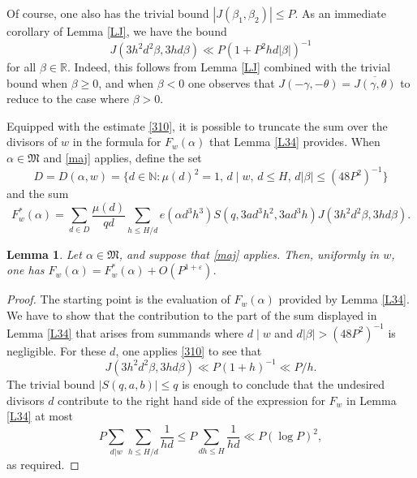 \documentclass[reqno]{amsart}
\newcommand\NN{{\mathbb N}}
\newtheorem{lemma}[thm]{Lemma}
\numberwithin{equation}{section}
\begin{document}
Of course, one also has the trivial bound $|J(\beta_1,\beta_2)|\le P$. 
As an immediate corollary of Lemma \ref{LJ}, we have the bound
\begin{equation}\label{310} J(3h^2d^2\beta, 3hd\beta) \ll P(1+P^2hd|\beta|)^{-1}  \end{equation}
for all $\beta\in \mathbb R$. Indeed, this follows from Lemma \ref{LJ} combined with the trivial bound when $\beta \ge 0$, and when 
$\beta<0$ one observes that 
$J(-\gamma,-\theta)= \overline{J(\gamma,\theta)}$ to reduce to the case where $\beta>0$.

Equipped with the estimate \eqref{310}, it is possible to truncate the sum over the divisors of $w$ in the formula for $F_w(\alpha)$ that
Lemma \ref{L34} provides. When $\alpha\in\mathfrak M$ and \eqref{maj} applies, define the set
\begin{equation}\label{313} D=D(\alpha, w)= \{d\in\NN: \mu(d)^2=1, \,d\mid w, \, d\le H,\, d|\beta|\le (48P^2)^{-1}\} \end{equation}
and the sum
\begin{equation}\label{314-} F^*_w(\alpha) =  
\sum_{d\in D} \frac{\mu(d)}{qd} \sum_{h\le H/d} e(\alpha d^3 h^3)
S(q,3ad^3h^2,3ad^3h) J(3h^2d^2\beta, 3hd\beta).
\end{equation}



\begin{lemma}\label{L36} Let $\alpha\in\mathfrak M$, and suppose that \eqref{maj} applies. Then, uniformly in $w$, one has $F_w(\alpha)=F^*_w(\alpha) + O(P^{1+\varepsilon})$.
\end{lemma}

\begin{proof} The starting point is the evaluation of $F_w(\alpha)$ provided by Lemma \ref{L34}. We have to show that the contribution to the part of the sum displayed in Lemma \ref{L34} that arises from summands where  $d\mid w$ and $d|\beta|> (48P^2)^{-1}$ is negligible. For these $d$, one applies \eqref{310} to see that
$$ J(3h^2d^2\beta, 3hd\beta) \ll P(1+h)^{-1} \ll P/h. $$
The trivial bound $|S(q,a,b)|\le q$ is enough to conclude that the undesired divisors $d$ contribute to the right hand side of the expression for $F_w$ in Lemma \ref{L34} at most
$$  P\sum_{d|w} \sum_{h\le H/d} \frac{1}{hd} \le P \sum_{dh\le H} \frac{1}{hd} \ll P (\log P)^2, $$
as required.  
\end{proof} 
\end{document}
